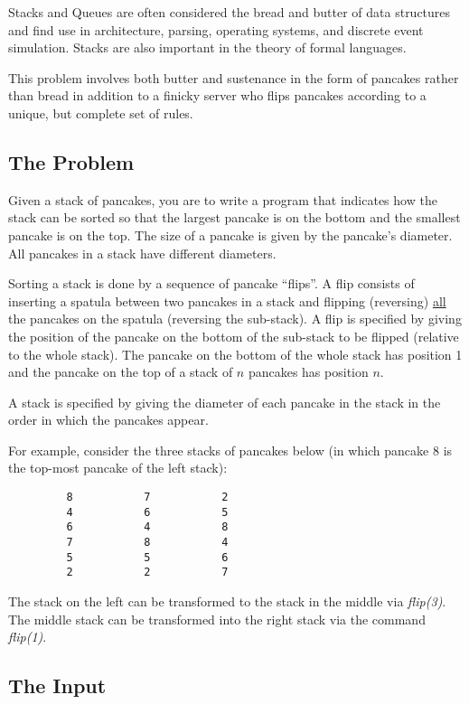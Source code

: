 Stacks and Queues are often considered the bread and butter of data
structures and find use in architecture, parsing, operating systems, and
discrete event simulation.  Stacks are also important in the theory of
formal languages.

This problem involves both butter and sustenance in the form of pancakes
rather than bread in addition to a finicky server who flips pancakes
according to a unique, but complete set of rules.


\subsection*{The Problem}

Given a stack of pancakes, you are to write a program that indicates how
the stack can be sorted so that the largest pancake is on the bottom
and the smallest pancake is on the top.  The size of a pancake is given
by the pancake's diameter.  All pancakes in a stack have different
diameters. 

Sorting a stack is done by a sequence of pancake ``flips''.  A flip
consists of inserting a spatula between two pancakes in a stack and
flipping (reversing) 
\underline{all} the pancakes on the spatula (reversing the sub-stack).  A
flip is specified by giving the position of the pancake on the bottom of
the sub-stack to be flipped (relative to the whole stack).  The pancake
on the bottom of the whole stack has position 1 and the pancake on the
top of a stack of $n$ pancakes has position $n$.

A stack is specified by giving the diameter of each pancake in the
stack in the order in which the pancakes appear.

For example, consider the three stacks of pancakes below 
(in which pancake 8 is the top-most pancake of the left stack):
\begin{verbatim}
         8           7           2
         4           6           5
         6           4           8
         7           8           4
         5           5           6
         2           2           7
\end{verbatim}
The stack on the left can be transformed to the stack in the middle 
via {\em flip(3)}.  The middle stack can be transformed into the right
stack via the command {\em flip(1)}.

\subsection*{The Input}

